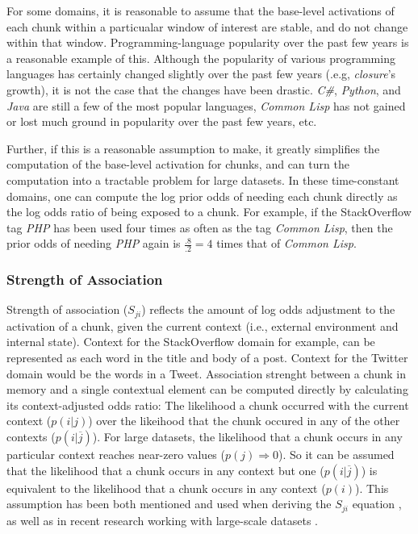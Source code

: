 \documentclass[man,floatsintext]{apa6}
\begin{document}
For some domains, it is reasonable to assume that the base-level activations of each chunk within a particualar window of interest are stable, and do not change within that window.
Programming-language popularity over the past few years is a reasonable example of this.
Although the popularity of various programming languages has certainly changed slightly over the past few years (.e.g, \emph{closure}'s growth), it is not the case that the changes have been drastic.
\emph{C\#}, \emph{Python}, and \emph{Java} are still a few of the most popular languages, \emph{Common Lisp} has not gained or lost much ground in popularity over the past few years, etc.

Further, if this is a reasonable assumption to make, it greatly simplifies the computation of the base-level activation for chunks, and can turn the computation into a tractable problem for large datasets.
In these time-constant domains, one can compute the log prior odds of needing each chunk directly as the log odds ratio of being exposed to a chunk.
For example, if the StackOverflow tag \emph{PHP} has been used four times as often as the tag \emph{Common Lisp}, then the prior odds of needing \emph{PHP} again is $\frac{.8}{.2}=4$ times that of \emph{Common Lisp}.

\subsubsection{Strength of Association}

Strength of association ($S_{ji}$) reflects the amount of log odds adjustment to the activation of a chunk, given the current context (i.e., external environment and internal state).
Context for the StackOverflow domain for example, can be represented as each word in the title and body of a post.
Context for the Twitter domain would be the words in a Tweet.
Association strenght between a chunk in memory and a single contextual element can be computed directly by calculating its context-adjusted odds ratio:
The likelihood a chunk occurred with the current context ($p(i|j)$) over the likeihood that the chunk occured in any of the other contexts ($p(i|\overline{j})$).
For large datasets, the likelihood that a chunk occurs in any particular context reaches near-zero values ($p(j) \Rightarrow 0$).
So it can be assumed that the likelihood that a chunk occurs in any context but one ($p(i|\overline{j})$) is equivalent to the likelihood that a chunk occurs in any context ($p(i)$).
This assumption has been both mentioned and used when deriving the $S_{ji}$ equation \parencite{Anderson1989}, as well as in recent research working with large-scale datasets \parencite{Stanley2013}.
\end{document}
